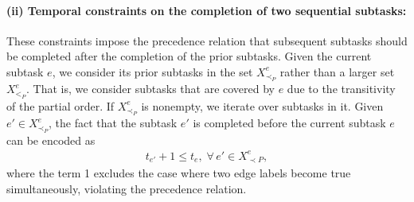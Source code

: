 \documentclass[Afour,sageh,times]{sagej}
\begin{document}
{{{{{\paragraph{(ii) Temporal constraints on the completion of two sequential subtasks:}\label{sec:constraintonedge}
These constraints impose the precedence relation that subsequent subtasks should be completed after the completion of the prior subtasks.   Given the current subtask $e$, we consider its prior subtasks in the set $X^e_{\prec_{P}}$  rather than a larger set $X^e_{<_{P}}$. That is, we consider  subtasks that are covered by $e$  due to the transitivity of the partial order.
If $X^e_{\prec_{P}}$ is nonempty, we iterate over subtasks in it.  Given $e' \in X^e_{\prec_{P}}$, the fact that the subtask $e'$ is completed before the current subtask $e$ can be encoded as
\begin{align}\label{eq:12}
  t_{e'} +  1  \leq t_e, \; \forall \, e' \in X_{\prec P}^e,
\end{align}
where the term 1 excludes the case where two edge labels become true simultaneously, violating the precedence relation.

}}}}}
\end{document}
